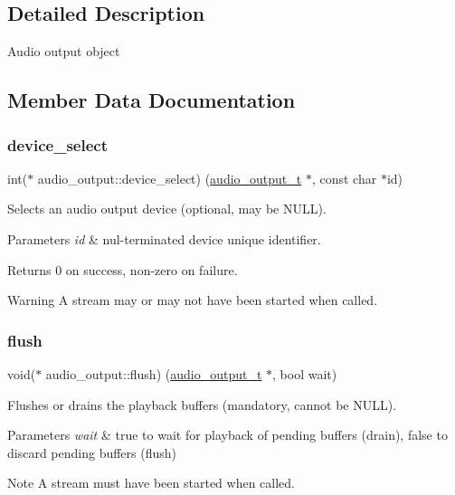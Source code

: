 \subsection{Detailed Description}
Audio output object 

\subsection{Member Data Documentation}
\mbox{\label{structaudio__output_a9e4f5e7ddf9fafe634225ca67de65b39}} 
\subsubsection{\texorpdfstring{device\+\_\+select}{device\_select}}
{\footnotesize\ttfamily int($\ast$ audio\+\_\+output\+::device\+\_\+select) (\hyperlink{structaudio__output}{audio\+\_\+output\+\_\+t} $\ast$, const char $\ast$id)}

Selects an audio output device (optional, may be N\+U\+LL). 
\begin{DoxyParams}{Parameters}
{\em id} & nul-\/terminated device unique identifier. \\
\hline
\end{DoxyParams}
\begin{DoxyReturn}{Returns}
0 on success, non-\/zero on failure. 
\end{DoxyReturn}
\begin{DoxyWarning}{Warning}
A stream may or may not have been started when called. 
\end{DoxyWarning}
\mbox{\label{structaudio__output_ac88458a193c7b6656f043df672f3687b}} 
\subsubsection{\texorpdfstring{flush}{flush}}
{\footnotesize\ttfamily void($\ast$ audio\+\_\+output\+::flush) (\hyperlink{structaudio__output}{audio\+\_\+output\+\_\+t} $\ast$, bool wait)}

Flushes or drains the playback buffers (mandatory, cannot be N\+U\+LL). 
\begin{DoxyParams}{Parameters}
{\em wait} & true to wait for playback of pending buffers (drain), false to discard pending buffers (flush) \\
\hline
\end{DoxyParams}
\begin{DoxyNote}{Note}
A stream must have been started when called. 
\end{DoxyNote}
\mbox{\label{structaudio__output_a9ed26f41b18750a73cd52b4c1b3e9369}} 
